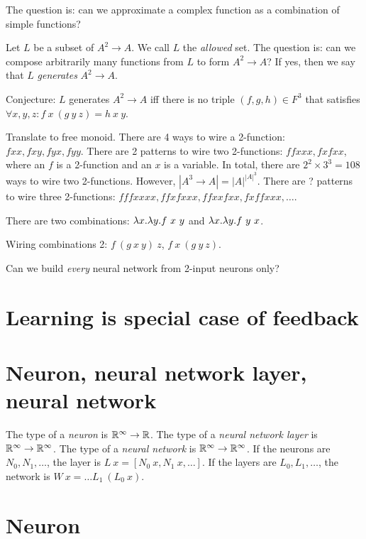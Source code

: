 The question is: can we approximate a complex function as a combination of simple functions?

Let \(L\) be a subset of \( A^2 \to A \).
We call \(L\) the \emph{allowed} set.
The question is: can we compose arbitrarily many functions from \(L\)
to form \( A^2 \to A \)?
If yes, then we say that \(L\) \emph{generates} \( A^2 \to A \).

Conjecture: \(L\) generates \(A^2 \to A\) iff
there is no triple \((f,g,h)\in F^3\) that satisfies \( \forall x,y,z: f~x~(g~y~z) = h~x~y \).

Translate to free monoid.
There are 4 ways to wire a 2-function: \( fxx, fxy, fyx, fyy \).
There are 2 patterns to wire two 2-functions: \( ffxxx, fxfxx \),
where an \(f\) is a 2-function and an \(x\) is a variable.
In total, there are \( 2^2 \times 3^3 = 108 \) ways to wire two 2-functions.
However, \( |A^3 \to A| = |A|^{|A|^3} \).
There are ? patterns to wire three 2-functions: \( fffxxxx, ffxfxxx, ffxxfxx, fxffxxx, \ldots \).

There are two combinations: \(\lambda x. \lambda y. f~x~y\) and \(\lambda x. \lambda y. f~y~x\).

Wiring combinations 2: \(f~(g~x~y)~z\), \(f~x~(g~y~z)\).

Can we build \emph{every} neural network from 2-input neurons only?

\section{Learning is special case of feedback}

\section{Neuron, neural network layer, neural network}

%
%
%
The type of a \emph{neuron} is \(\mathbb{R}^\infty \to \mathbb{R}\).
The type of a \emph{neural network layer} is \(\mathbb{R}^\infty \to \mathbb{R}^\infty\).
The type of a \emph{neural network} is \(\mathbb{R}^\infty \to \mathbb{R}^\infty\).
If the neurons are \(N_0,N_1,\ldots\), the layer is \(L~x = [N_0~x, N_1~x, \ldots]\).
If the layers are \(L_0,L_1,\ldots\), the network is \(W~x = \ldots L_1~(L_0~x) \).

\section{Neuron}

